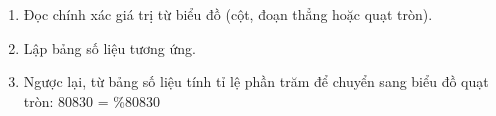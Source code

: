 \begin{enumerate}
\item Đọc chính xác giá trị từ biểu đồ (cột, đoạn thẳng hoặc quạt tròn).
\item Lập bảng số liệu tương ứng.
\item Ngược lại, từ bảng số liệu tính tỉ lệ phần trăm để chuyển sang biểu đồ quạt tròn:
80830 =  \%80830
\end{enumerate}
